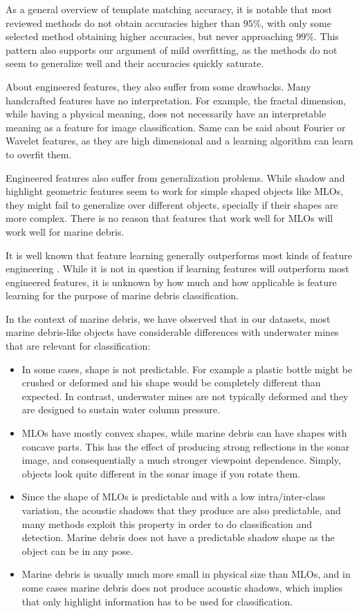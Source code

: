 As a general overview of template matching accuracy, it is notable that most reviewed methods do not obtain accuracies higher than $95 \%$, with only some selected method obtaining higher accuracies, but never approaching $99 \%$. This pattern also supports our argument of mild overfitting, as the methods do not seem to generalize well and their accuracies quickly saturate.

About engineered features, they also suffer from some drawbacks. Many handcrafted features have no interpretation. For example, the fractal dimension, while having a physical meaning, does not necessarily have an interpretable meaning as a feature for image classification. Same can be said about Fourier or Wavelet features, as they are high dimensional and a learning algorithm can learn to overfit them.

Engineered features also suffer from generalization problems. While shadow and highlight geometric features seem to work for simple shaped objects like MLOs, they might fail to generalize over different objects, specially if their shapes are more complex. There is no reason that features that work well for MLOs will work well for marine debris.

It is well known that feature learning generally outperforms most kinds of feature engineering \cite{sharif2014cnn}. While it is not in question if learning features will outperform most engineered features, it is unknown by how much and how applicable is feature learning for the purpose of marine debris classification.

In the context of marine debris, we have observed that in our datasets, most marine debris-like objects have considerable differences with underwater mines that are relevant for classification:

\begin{itemize}
	\item In some cases, shape is not predictable. For example a plastic bottle might be crushed or deformed and his shape would be completely different than expected. In contrast, underwater mines are not typically deformed and they are designed to sustain water column pressure.
	\item MLOs have mostly convex shapes, while marine debris can have shapes with concave parts. This has the effect of producing strong reflections in the sonar image, and consequentially a much stronger viewpoint dependence. Simply, objects look quite different in the sonar image if you rotate them.
	\item Since the shape of MLOs is predictable and with a low intra/inter-class variation, the acoustic shadows that they produce are also predictable, and many methods exploit this property in order to do classification and detection. Marine debris does not have a predictable shadow shape as the object can be in any pose.
    \item Marine debris is usually much more small in physical size than MLOs, and in some cases marine debris does not produce acoustic shadows, which implies that only highlight information has to be used for classification.
\end{itemize}

